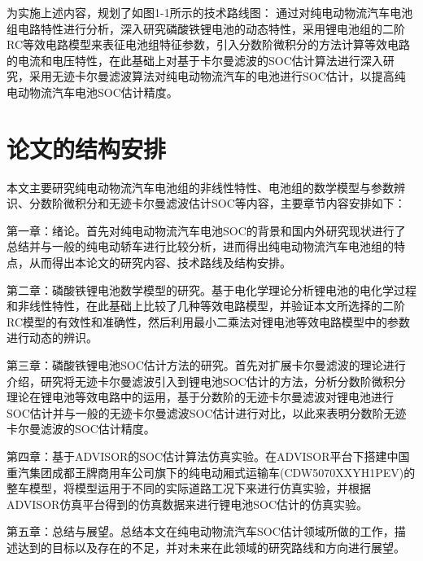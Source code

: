 为实施上述内容，规划了如图1-1所示的技术路线图：
通过对纯电动物流汽车电池组电路特性进行分析，深入研究磷酸铁锂电池的动态特性，采用锂电池组的二阶RC等效电路模型来表征电池组特征参数，引入分数阶微积分的方法计算等效电路的电流和电压特性，在此基础上对基于卡尔曼滤波的SOC估计算法进行深入研究，采用无迹卡尔曼滤波算法对纯电动物流汽车的电池进行SOC估计，以提高纯电动物流汽车电池SOC估计精度。
\section{论文的结构安排}
本文主要研究纯电动物流汽车电池组的非线性特性、电池组的数学模型与参数辨识、分数阶微积分和无迹卡尔曼滤波估计SOC等内容，主要章节内容安排如下：

第一章：绪论。首先对纯电动物流汽车电池SOC的背景和国内外研究现状进行了总结并与一般的纯电动轿车进行比较分析，进而得出纯电动物流汽车电池组的特点，从而得出本论文的研究内容、技术路线及结构安排。

第二章：磷酸铁锂电池数学模型的研究。基于电化学理论分析锂电池的电化学过程和非线性特性，在此基础上比较了几种等效电路模型，并验证本文所选择的二阶RC模型的有效性和准确性，然后利用最小二乘法对锂电池等效电路模型中的参数进行动态的辨识。

第三章：磷酸铁锂电池SOC估计方法的研究。首先对扩展卡尔曼滤波的理论进行介绍，研究将无迹卡尔曼滤波引入到锂电池SOC估计的方法，分析分数阶微积分理论在锂电池等效电路中的运用，基于分数阶的无迹卡尔曼滤波对锂电池进行SOC估计并与一般的无迹卡尔曼滤波SOC估计进行对比，以此来表明分数阶无迹卡尔曼滤波的SOC估计精度。

第四章：基于ADVISOR的SOC估计算法仿真实验。在ADVISOR平台下搭建中国重汽集团成都王牌商用车公司旗下的纯电动厢式运输车(CDW5070XXYH1PEV)的整车模型，将模型运用于不同的实际道路工况下来进行仿真实验，并根据ADVISOR仿真平台得到的仿真数据来进行锂电池SOC估计的仿真实验。

第五章：总结与展望。总结本文在纯电动物流汽车SOC估计领域所做的工作，描述达到的目标以及存在的不足，并对未来在此领域的研究路线和方向进行展望。

	

	
	
